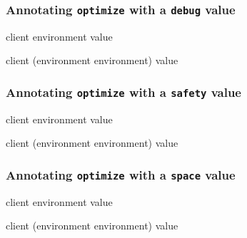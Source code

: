 \subsubsection{Annotating \texttt{optimize} with a \texttt{debug} value}

{\footnotesize
{} {client environment value}
}


{\footnotesize
{}
{client
 (environment environment)
  value}
}


\subsubsection{Annotating \texttt{optimize} with a \texttt{safety} value}

{\footnotesize
{} {client environment value}
}


{\footnotesize
{}
{client
 (environment environment)
  value}
}


\subsubsection{Annotating \texttt{optimize} with a \texttt{space} value}

{\footnotesize
{} {client environment value}
}


{\footnotesize
{}
{client
 (environment environment)
  value}
}

